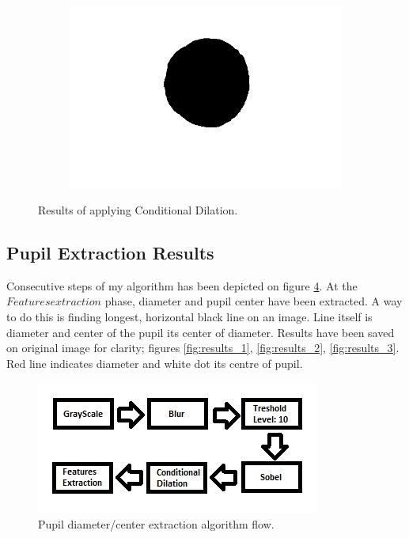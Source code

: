 \documentclass{article}
\begin{document}
\begin{figure}[H]
\begin{subfigure}{.09\textwidth}
  \label{fig:arrow}
\end{subfigure}%
\begin{subfigure}{.35\textwidth}
  \centering
  \includegraphics[width=0.97\linewidth]{_Figures/raw_data_4_cond_dilation.png}
  \caption{}
  \label{fig:raw_4_closure}
\end{subfigure}

\caption{Results of applying Conditional Dilation. }
\label{fig:closure_results}
\end{figure}




%
%
\newpage
\subsection{Pupil Extraction Results}
Consecutive steps of my algorithm has been depicted on figure \ref{fig:algo_flow}. At the $Features extraction$ phase, diameter and pupil center have been extracted. A way to do this is finding longest, horizontal black line on an image. Line itself is diameter and center of the pupil its center of diameter. Results have been saved on original image for clarity; figures \ref{fig:results_1}, \ref{fig:results_2}, \ref{fig:results_3}. Red line indicates diameter and white dot its centre of pupil.

\begin{figure}[H]
  \centering
  \includegraphics[width=0.8\linewidth]{_Figures/algorithm_flow.jpg}
  \caption{Pupil diameter/center extraction algorithm flow.}
  \label{fig:algo_flow}
\end{figure}%
\end{document}
